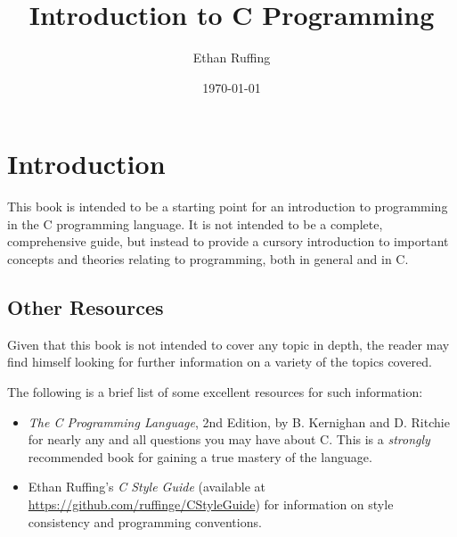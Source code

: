 \documentclass[11pt]{book}
\title{Introduction to C Programming}
\date{\today}
\author{Ethan Ruffing}
\begin{document}
\begin{titlepage}
	\maketitle
	\thispagestyle{empty}
\end{titlepage}

\tableofcontents

\newpage
{} %

\chapter*{Introduction}\label{ch:introduction}
This book is intended to be a starting point for an introduction to programming
in the C programming language. It is not intended to be a complete,
comprehensive guide, but instead to provide a cursory introduction to important
concepts and theories relating to programming, both in general and in C.

\section*{Other Resources}\label{sec:other-resources}
Given that this book is not intended to cover any topic in depth, the reader may
find himself looking for further information on a variety of the topics covered.

The following is a brief list of some excellent resources for such information:

\begin{itemize}
	\item \emph{The C Programming Language}, 2nd Edition, by B. Kernighan and 
		D. Ritchie for nearly any and all questions you may have about C. This
		is a \emph{strongly} recommended book for gaining a true mastery of the
		language.
	\item Ethan Ruffing's \emph{C Style Guide} (available at
		\url{https://github.com/ruffinge/CStyleGuide}) for information on style
		consistency and programming conventions.
\end{itemize}


\end{document}
